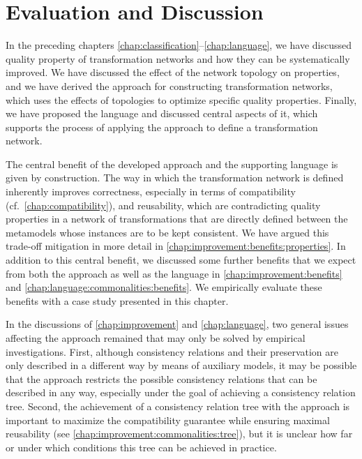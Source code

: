 \chapter{Evaluation and Discussion 
}
\label{chap:commonalities_evaluation}

In the preceding chapters \ref{chap:classification}--\ref{chap:language}, we have discussed quality property of transformation networks and how they can be systematically improved.
We have discussed the effect of the network topology on properties, and we have derived the \commonalities approach for constructing transformation networks, which uses the effects of topologies to optimize specific quality properties.
Finally, we have proposed the \commonalities language and discussed central aspects of it, which supports the process of applying the \commonalities approach to define a transformation network.

The central benefit of the developed \commonalities approach and the supporting \commonalities language is given by construction.
The way in which the transformation network is defined inherently improves correctness, especially in terms of compatibility (cf.\ \autoref{chap:compatibility}), and reusability, which are contradicting quality properties in a network of transformations that are directly defined between the metamodels whose instances are to be kept consistent.
We have argued this trade-off mitigation in more detail in \autoref{chap:improvement:benefits:properties}.
In addition to this central benefit, we discussed some further benefits that we expect from both the \commonalities approach as well as the \commonalities language in \autoref{chap:improvement:benefits} and \autoref{chap:language:commonalities:benefits}.
We empirically evaluate these benefits with a case study presented in this chapter.

In the discussions of \autoref{chap:improvement} and \autoref{chap:language}, two general issues affecting the \commonalities approach remained that may only be solved by empirical investigations.
First, although consistency relations and their preservation are only described in a different way by means of auxiliary models, it may be possible that the approach restricts the possible consistency relations that can be described in any way, especially under the goal of achieving a consistency relation tree.
Second, the achievement of a consistency relation tree with the approach is important to maximize the compatibility guarantee while ensuring maximal reusability (see \autoref{chap:improvement:commonalities:tree}), but it is unclear how far or under which conditions this tree can be achieved in practice.

